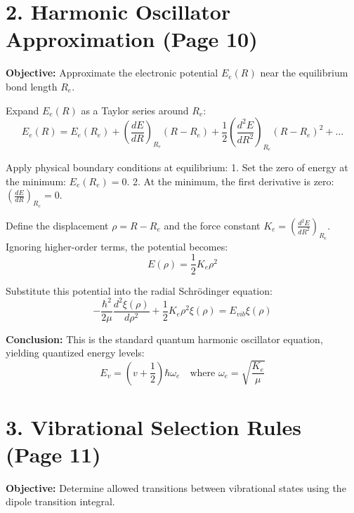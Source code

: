 \documentclass{book}
\begin{document}
\vspace{1cm}

\section*{2. Harmonic Oscillator Approximation (Page 10)}

\textbf{Objective:} Approximate the electronic potential $E_e(R)$ near the equilibrium bond length $R_e$. %

Expand $E_e(R)$ as a Taylor series around $R_e$:
\begin{equation}
    E_e(R) = E_e(R_e) + \left( \frac{dE}{dR} \right)_{R_e} (R-R_e) + \frac{1}{2} \left( \frac{d^2E}{dR^2} \right)_{R_e} (R-R_e)^2 + \dots
\end{equation}

Apply physical boundary conditions at equilibrium:
1. Set the zero of energy at the minimum: $E_e(R_e) = 0$. %
2. At the minimum, the first derivative is zero: $\left( \frac{dE}{dR} \right)_{R_e} = 0$. %

Define the displacement $\rho = R - R_e$ and the force constant $K_e = \left( \frac{d^2E}{dR^2} \right)_{R_e}$. %
Ignoring higher-order terms, the potential becomes:
\begin{equation}
    E(\rho) = \frac{1}{2} K_e \rho^2
\end{equation}

Substitute this potential into the radial Schrödinger equation:
\begin{equation}
    -\frac{\hbar^2}{2\mu} \frac{d^2 \xi(\rho)}{d\rho^2} + \frac{1}{2} K_e \rho^2 \xi(\rho) = E_{vib} \xi(\rho)
\end{equation}

\textbf{Conclusion:} This is the standard quantum harmonic oscillator equation, yielding quantized energy levels:
\begin{equation}
    E_v = \left( v + \frac{1}{2} \right) \hbar \omega_e \quad \text{where } \omega_e = \sqrt{\frac{K_e}{\mu}}
\end{equation}

\vspace{1cm}

\section*{3. Vibrational Selection Rules (Page 11)}

\textbf{Objective:} Determine allowed transitions between vibrational states using the dipole transition integral. %
\end{document}
